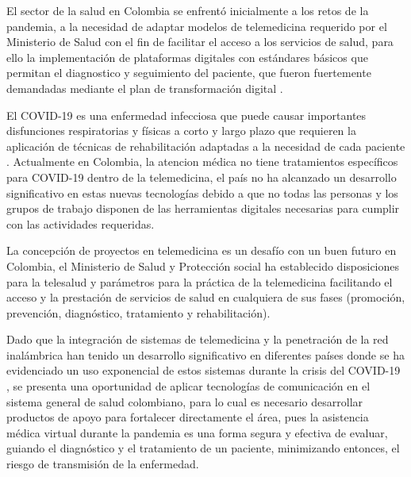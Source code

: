 \documentclass[12pt]{article}
\begin{document}
El sector de la salud en Colombia se enfrentó inicialmente a los retos de la pandemia, a la necesidad de adaptar modelos de telemedicina requerido por el Ministerio de Salud con el fin de facilitar el acceso a los servicios de salud, para ello la implementación de plataformas digitales con estándares básicos que permitan el diagnostico y seguimiento del paciente, que fueron fuertemente demandadas mediante el plan de transformación digital \cite{31}.

El COVID-19 es una enfermedad infecciosa que puede causar importantes disfunciones respiratorias y físicas a corto y largo plazo que requieren la aplicación de técnicas de rehabilitación adaptadas a la necesidad de cada paciente \cite{32}. Actualmente en Colombia, la atencion médica no tiene tratamientos espec\'ificos para COVID-19 dentro de la telemedicina, el pa\'is no ha alcanzado un desarrollo significativo en estas nuevas tecnolog\'ias debido a que no todas las personas y los grupos de trabajo disponen de las herramientas digitales necesarias para cumplir con las actividades requeridas. 

La concepci\'on de proyectos en telemedicina es un desaf\'io con un buen futuro en Colombia,  el Ministerio de Salud y Protecci\'on social ha establecido disposiciones para la telesalud y par\'ametros para la pr\'actica de la telemedicina facilitando el acceso y la prestaci\'on de servicios de salud en cualquiera de sus fases (promoci\'on, prevenci\'on, diagn\'ostico, tratamiento y rehabilitaci\'on)\cite{8}.



Dado que la integraci\'on de sistemas de telemedicina y la penetración de la red inalámbrica han tenido un desarrollo significativo en diferentes pa\'ises donde se ha evidenciado un uso exponencial de estos sistemas durante la crisis del COVID-19 \cite{10}, se presenta una oportunidad de aplicar tecnolog\'ias de comunicaci\'on en el sistema general de salud colombiano, para lo cual es necesario desarrollar productos de apoyo para fortalecer directamente el \'area, pues la asistencia m\'edica virtual durante la pandemia es una forma segura y efectiva de evaluar, guiando el diagn\'ostico y el tratamiento de un paciente, minimizando entonces, el riesgo de transmisi\'on de la enfermedad.
\end{document}
